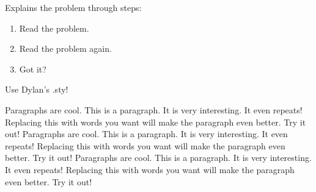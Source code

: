 \documentclass[twoside]{article}
\begin{document}
\begin{problem}

\end{problem}
\begin{walk}
Explains the problem through steps:
\begin{enumerate}
    \item Read the problem.
    \item Read the problem again.
    \item Got it?
\end{enumerate}
\end{walk}

\begin{moral}
Use Dylan's .sty!
\end{moral}

\begin{fact}

\end{fact}

\begin{remark}

\end{remark}

\begin{basecase}

\end{basecase}

\begin{indstep}

\end{indstep}

\begin{case}

\end{case}

\begin{boxpar}
Paragraphs are cool. This is a paragraph. It is very interesting. It even repeats! Replacing this with words you want will make the paragraph even better. Try it out! Paragraphs are cool. This is a paragraph. It is very interesting. It even repeats! Replacing this with words you want will make the paragraph even better. Try it out! Paragraphs are cool. This is a paragraph. It is very interesting. It even repeats! Replacing this with words you want will make the paragraph even better. Try it out!
\end{boxpar}
\end{document}
